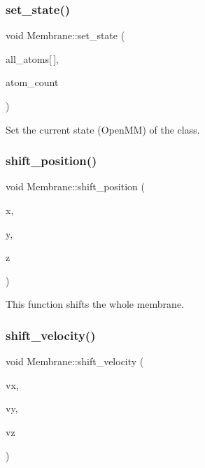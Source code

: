 \subsubsection{\texorpdfstring{set\_state()}{set\_state()}}
{\footnotesize\ttfamily void Membrane\+::set\+\_\+state (\begin{DoxyParamCaption}\item[{\mbox{\hyperlink{structMyAtomInfo}{My\+Atom\+Info}}}]{all\+\_\+atoms\mbox{[}$\,$\mbox{]},  }\item[{int}]{atom\+\_\+count }\end{DoxyParamCaption})}

Set the current state (Open\+MM) of the class. \mbox{\label{classMembrane_aae01bd33119728d0b268081bee3815e7}} 
\subsubsection{\texorpdfstring{shift\_position()}{shift\_position()}}
{\footnotesize\ttfamily void Membrane\+::shift\+\_\+position (\begin{DoxyParamCaption}\item[{double}]{x,  }\item[{double}]{y,  }\item[{double}]{z }\end{DoxyParamCaption})\hspace{0.3cm}{\ttfamily [inline]}}

This function shifts the whole membrane. \mbox{\label{classMembrane_a2fb1efa5e780590d62530cc31c8e6b07}} 
\subsubsection{\texorpdfstring{shift\_velocity()}{shift\_velocity()}}
{\footnotesize\ttfamily void Membrane\+::shift\+\_\+velocity (\begin{DoxyParamCaption}\item[{double}]{vx,  }\item[{double}]{vy,  }\item[{double}]{vz }\end{DoxyParamCaption})\hspace{0.3cm}{\ttfamily [inline]}}

